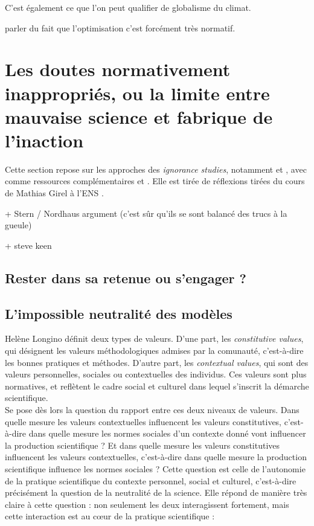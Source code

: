 C'est également ce que l'on peut qualifier de globalisme du climat. 


\begin{tcolorbox}
    parler du fait que l'optimisation c'est forcément très normatif. 
\end{tcolorbox}

\section{Les doutes normativement inappropriés, ou la limite entre mauvaise science et fabrique de l'inaction}

Cette section repose sur les approches des \textit{ignorance studies}, notamment \cite{melo-martin_fight_2018} et \cite{gross_routledge_2015}, avec comme ressources complémentaires \cite{noauthor_carnet_2024} et \cite{proctor_agnotology_2008}. Elle est tirée de réflexions tirées du cours de Mathias Girel à l'ENS \cite{girel_vertus_2023}. 



+ Stern / Nordhaus argument (c'est sûr qu'ils se sont balancé des trucs à la gueule) 

+ steve keen \cite{keen_appallingly_2021}

\subsection{Rester dans sa retenue ou s'engager ?}

\subsection{L'impossible neutralité des modèles}

Helène Longino définit deux types de valeurs. D'une part, les \emph{constitutive values}, qui désignent les valeurs méthodologiques admises par la comunauté, c'est-à-dire les bonnes pratiques et méthodes. D'autre part, les \emph{contextual values}, qui sont des valeurs personnelles, sociales ou contextuelles des individus. Ces valeurs sont plus normatives, et reflètent le cadre social et culturel dans lequel s'inscrit la démarche scientifique. \\

Se pose dès lors la question du rapport entre ces deux niveaux de valeurs. Dans quelle mesure les valeurs contextuelles influencent les valeurs constitutives, c'est-à-dire dans quelle mesure les normes sociales d'un contexte donné vont influencer la production scientifique ? Et dans quelle mesure les valeurs constitutives influencent les valeurs contextuelles, c'est-à-dire dans quelle mesure la production scientifique influence les normes sociales ? Cette question est celle de l'autonomie de la pratique scientifique du contexte personnel, social et culturel, c'est-à-dire précisément la question de la neutralité de la science. Elle répond de manière très claire à cette question : non seulement les deux interagissent fortement, mais cette interaction est au cœur de la pratique scientifique : 

